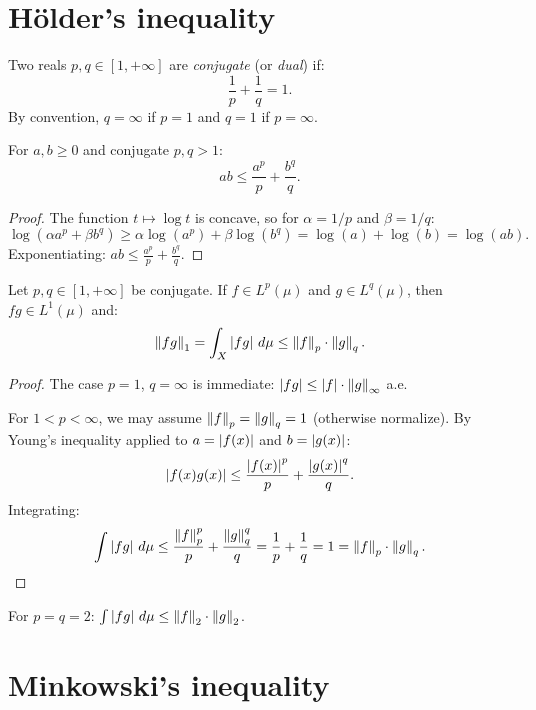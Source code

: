 \section{H\"older's inequality}

\begin{definition}
Two reals $p, q \in [1, +\infty]$ are \emph{conjugate} (or \emph{dual}) if:
\[
\frac{1}{p} + \frac{1}{q} = 1.
\]
By convention, $q = \infty$ if $p = 1$ and $q = 1$ if $p = \infty$.
\end{definition}

\begin{lemma}
For $a, b \geq 0$ and conjugate $p, q > 1$:
\[
ab \leq \frac{a^p}{p} + \frac{b^q}{q}.
\]
\end{lemma}

\begin{proof}
The function $t \mapsto \log t$ is concave, so for $\alpha = 1/p$ and
$\beta = 1/q$:
\[
\log(\alpha a^p + \beta b^q) \geq \alpha \log(a^p) + \beta \log(b^q)
= \log(a) + \log(b) = \log(ab).
\]
Exponentiating: $ab \leq \frac{a^p}{p} + \frac{b^q}{q}$.
\end{proof}

\begin{theorem}
\label{thm:holder}
Let $p, q \in [1, +\infty]$ be conjugate. If $f \in L^p(\mu)$ and
$g \in L^q(\mu)$, then $fg \in L^1(\mu)$ and:
\[
\left\| fg \right\|_1 = \int_X \left| fg \right|\, d\mu \leq \left\| f \right\|_p \cdot \left\| g \right\|_q.
\]
\end{theorem}

\begin{proof}
The case $p = 1$, $q = \infty$ is immediate: $\left| fg \right| \leq \left| f \right| \cdot
\left\| g \right\|_\infty$ a.e.

For $1 < p < \infty$, we may assume $\left\| f \right\|_p = \left\| g \right\|_q = 1$ (otherwise
normalize). By Young's inequality applied to $a = \left| f(x) \right|$ and
$b = \left| g(x) \right|$:
\[
\left| f(x) g(x) \right| \leq \frac{\left| f(x) \right|^p}{p} + \frac{\left| g(x) \right|^q}{q}.
\]
Integrating:
\[
\int \left| fg \right|\, d\mu \leq \frac{\left\| f \right\|_p^p}{p} + \frac{\left\| g \right\|_q^q}{q}
= \frac{1}{p} + \frac{1}{q} = 1 = \left\| f \right\|_p \cdot \left\| g \right\|_q. \qedhere
\]
\end{proof}

\begin{corollary}
For $p = q = 2$: $\int \left| fg \right|\, d\mu \leq \left\| f \right\|_2 \cdot \left\| g \right\|_2$.
\end{corollary}

\section{Minkowski's inequality}

